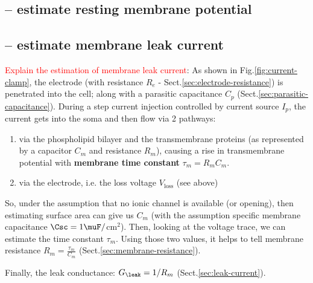 \subsection{-- estimate resting membrane potential}
\label{sec:resting-membrane-potential-estimation}

\subsection{-- estimate membrane leak current}
\label{sec:leak-current-estimation}
\label{sec:leak-conductance-estimation}

\textcolor{red}{Explain the estimation of membrane leak current}: As shown in
Fig.\ref{fig:current-clamp}, the electrode (with resistance $R_e$ -
Sect.\ref{sec:electrode-resistance}) is penetrated into the cell; along with a
parasitic capacitance $C_p$ (Sect.\ref{sec:parasitic-capacitance}).  During a
step current injection controlled by current source $I_p$, the current gets into
the soma and then flow via 2 pathways:
\begin{enumerate}
  
  \item via the phospholipid bilayer and the transmembrane proteins (as
  represented by a capacitor $C_m$ and resistance $R_m$), causing a rise in
  transmembrane potential with {\bf membrane time constant} $\tau_m = R_m C_m$.

  \item via the electrode, i.e. the loss voltage $V_\text{loss}$ (see above)

\end{enumerate}

So, under the assumption that no ionic channel is available (or opening), then
estimating surface area can give us $C_m$ (with the assumption specific
membrane capacitance $\Csc = 1 \muF/$cm$^2$). Then, looking at the voltage
trace, we can estimate the time constant $\tau_m$.  Using those two values,
it helps to tell membrane resistance $R_m = \frac{\tau_m}{C_m}$
(Sect.\ref{sec:membrane-resistance}).

Finally, the leak conductance: $G_\leak = 1/R_m$
(Sect.\ref{sec:leak-current}).


